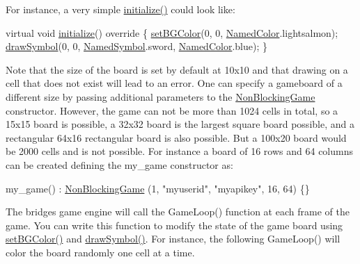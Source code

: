 For instance, a very simple \mbox{\hyperlink{classbridges_1_1game_1_1_game_base_a9b6eb6fa7fceaac09d204b549164037f}{initialize()}} could look like\+: 
\begin{DoxyCode}
\textcolor{keyword}{virtual} \textcolor{keywordtype}{void} \mbox{\hyperlink{classbridges_1_1game_1_1_game_base_a9b6eb6fa7fceaac09d204b549164037f}{initialize}}()\textcolor{keyword}{ override }\{
  \mbox{\hyperlink{classbridges_1_1game_1_1_game_base_ab667bbca1c81e5fb3aa8d81d70fe8cd2}{setBGColor}}(0, 0, \mbox{\hyperlink{namespacebridges_1_1game_afaa832a4322b25b6a4ebfba832f10f26}{NamedColor}}.lightsalmon);
  \mbox{\hyperlink{classbridges_1_1game_1_1_game_base_a415fa8f70bef364dfa966f2a86048901}{drawSymbol}}(0, 0, \mbox{\hyperlink{namespacebridges_1_1game_ab9a19c7ab6e2ebac2f95180e21733487}{NamedSymbol}}.sword, \mbox{\hyperlink{namespacebridges_1_1game_afaa832a4322b25b6a4ebfba832f10f26}{NamedColor}}.blue);
\}
\end{DoxyCode}


Note that the size of the board is set by default at 10x10 and that drawing on a cell that does not exist will lead to an error. One can specify a gameboard of a different size by passing additional parameters to the \mbox{\hyperlink{classbridges_1_1game_1_1_non_blocking_game}{Non\+Blocking\+Game}} constructor. However, the game can not be more than 1024 cells in total, so a 15x15 board is possible, a 32x32 board is the largest square board possible, and a rectangular 64x16 rectangular board is also possible. But a 100x20 board would be 2000 cells and is not possible. For instance a board of 16 rows and 64 columns can be created defining the my\+\_\+game constructor as\+:


\begin{DoxyCode}
my\_game() : \mbox{\hyperlink{classbridges_1_1game_1_1_non_blocking_game_a3226aa7e7ff129e916f4bd5aabcb2e72}{NonBlockingGame}} (1, \textcolor{stringliteral}{"myuserid"},  \textcolor{stringliteral}{"myapikey"}, 16, 64) \{\}
\end{DoxyCode}


The bridges game engine will call the Game\+Loop() function at each frame of the game. You can write this function to modify the state of the game board using \mbox{\hyperlink{classbridges_1_1game_1_1_game_base_ab667bbca1c81e5fb3aa8d81d70fe8cd2}{set\+B\+G\+Color()}} and \mbox{\hyperlink{classbridges_1_1game_1_1_game_base_a415fa8f70bef364dfa966f2a86048901}{draw\+Symbol()}}. For instance, the following Game\+Loop() will color the board randomly one cell at a time.


